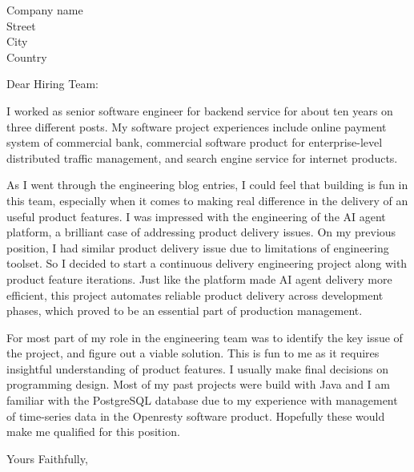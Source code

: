 \documentclass{letter}
\begin{document}
\begin{letter}{Company name \\ Street\\ City\\ Country}
  \opening{Dear Hiring Team:}
  I worked as senior software engineer for backend service for about ten years on three different posts. My software project experiences include online payment system of commercial bank, commercial software product for enterprise-level distributed traffic management, and search engine service for internet products.

  As I went through the engineering blog entries, I could feel that building is fun in this team, especially when it comes to making real difference in the delivery of an useful product features. I was impressed with the engineering of the AI agent platform, a brilliant case of addressing product delivery issues. On my previous position, I had similar product delivery issue due to limitations of engineering toolset. So I decided to start a continuous delivery engineering project along with product feature iterations. Just like the platform made AI agent delivery more efficient, this project automates reliable product delivery across development phases, which proved to be an essential part of production management.

  For most part of my role in the engineering team was to identify the key issue of the project, and figure out a viable solution. This is fun to me as it requires insightful understanding of product features. I usually make final decisions on programming design. Most of my past projects were build with Java and I am familiar with the PostgreSQL database due to my experience with management of time-series data in the Openresty software product. Hopefully these would make me qualified for this position.
  \closing{Yours Faithfully,}
\end{letter}
\end{document}
